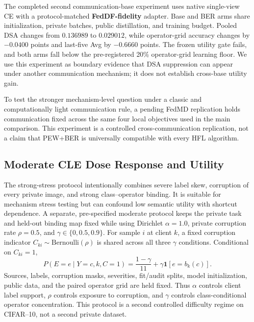 The completed second communication-base experiment uses native single-view CE with a protocol-matched \textbf{FedDF-fidelity} adapter. Base and BER arms share initialization, private batches, public distillation, and training budget. Pooled DSA changes from \(0.136989\) to \(0.029012\), while operator-grid accuracy changes by \(-0.0400\) points and last-five Avg by \(-0.6660\) points. The frozen utility gate fails, and both arms fall below the pre-registered 20\% operator-grid learning floor. We use this experiment as boundary evidence that DSA suppression can appear under another communication mechanism; it does not establish cross-base utility gain.

To test the stronger mechanism-level question under a classic and computationally light communication rule, a pending FedMD replication holds communication fixed across the same four local objectives used in the main comparison. This experiment is a controlled cross-communication replication, not a claim that PEW+BER is universally compatible with every HFL algorithm.


\subsection{Moderate CLE Dose Response and Utility}

The strong-stress protocol intentionally combines severe label skew, corruption of every private image, and strong class--operator binding. It is suitable for mechanism stress testing but can confound low semantic utility with shortcut dependence. A separate, pre-specified moderate protocol keeps the private task and held-out binding map fixed while using Dirichlet $\alpha=1.0$, private corruption rate $\rho=0.5$, and $\gamma\in\{0,0.5,0.9\}$. For sample $i$ at client $k$, a fixed corruption indicator $C_{ki}\sim\mathrm{Bernoulli}(\rho)$ is shared across all three $\gamma$ conditions. Conditional on $C_{ki}=1$,
\[
P(E=e\mid Y=c,k,C=1)=\frac{1-\gamma}{11}+\gamma\mathbf{1}[e=b_k(c)].
\]
Sources, labels, corruption masks, severities, fit/audit splits, model initialization, public data, and the paired operator grid are held fixed. Thus $\alpha$ controls client label support, $\rho$ controls exposure to corruption, and $\gamma$ controls class-conditional operator concentration. This protocol is a second controlled difficulty regime on CIFAR--10, not a second private dataset.

